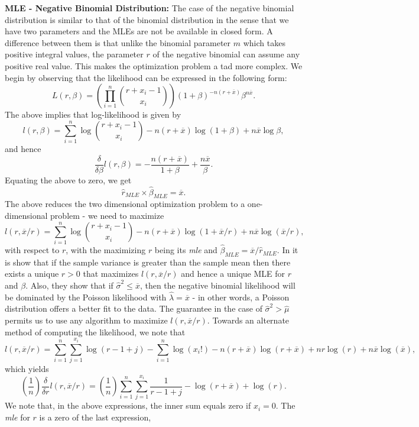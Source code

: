 \documentclass[]{book}
\theoremstyle{definition}
\theoremstyle{definition}
\theoremstyle{definition}
\theoremstyle{remark}
\begin{document}
\textbf{MLE - Negative Binomial Distribution:} The case of the negative
binomial distribution is similar to that of the binomial distribution in
the sense that we have two parameters and the MLEs are not be available
in closed form. A difference between them is that unlike the binomial
parameter \(m\) which takes positive integral values, the parameter
\(r\) of the negative binomial can assume any positive real value. This
makes the optimization problem a tad more complex. We begin by observing
that the likelihood can be expressed in the following form: \[
L(r,\beta)=\left(\prod_{i=1}^n \binom{r+x_i-1}{x_i}\right) (1+\beta)^{-n(r+\overline{x})} \beta^{n\overline{x}}.  
\] The above implies that log-likelihood is given by \[
l(r,\beta)=\sum_{i=1}^n \log\binom{r+x_i-1}{x_i} -n(r+\overline{x}) \log(1+\beta) +n\overline{x}\log\beta,
\] and hence \[
\frac{\delta}{\delta\beta} l(r,\beta) = -\frac{n(r+\overline{x})}{1+\beta} + \frac{n\overline{x}}{\beta}.
\] Equating the above to zero, we get \[
\hat{r}_{MLE}\times \hat{\beta}_{MLE} = \overline{x}.
\] The above reduces the two dimensional optimization problem to a
one-dimensional problem - we need to maximize \[
l(r,\overline{x}/r)=\sum_{i=1}^n \log\binom{r+x_i-1}{x_i} -n(r+\overline{x}) \log(1+\overline{x}/r) +n\overline{x}\log(\overline{x}/r),
\] with respect to \(r\), with the maximizing \(r\) being its \emph{mle}
and \(\hat{\beta}_{MLE}=\overline{x}/\hat{r}_{MLE}\). In
\citep{levin1977} it is show that if the sample variance is greater than
the sample mean then there exists a unique \(r>0\) that maximizes
\(l(r,\overline{x}/r)\) and hence a unique MLE for \(r\) and \(\beta\).
Also, they show that if \(\hat{\sigma}^2\leq \overline{x}\), then the
negative binomial likelihood will be dominated by the Poisson likelihood
with \(\hat{\lambda}=\overline{x}\) - in other words, a Poisson
distribution offers a better fit to the data. The guarantee in the case
of \(\hat{\sigma}^2>\hat{\mu}\) permits us to use any algorithm to
maximize \(l(r,\overline{x}/r)\). Towards an alternate method of
computing the likelihood, we note that \[
l(r,\overline{x}/r)=\sum_{i=1}^n \sum_{j=1}^{x_i}\log(r-1+j) - \sum_{i=1}^n\log(x_i!) - n(r+\overline{x}) \log(r+\overline{x}) + nr\log(r) + n\overline{x}\log(\overline{x}),
\] which yields \[
\left(\frac{1}{n}\right)\frac{\delta}{\delta r}l(r,\overline{x}/r)=\left(\frac{1}{n}\right)\sum_{i=1}^n \sum_{j=1}^{x_i}\frac{1}{r-1+j} - \log(r+\overline{x}) + \log(r).
\] We note that, in the above expressions, the inner sum equals zero if
\(x_i=0\). The \emph{mle} for \(r\) is a zero of the last expression,
\end{document}
